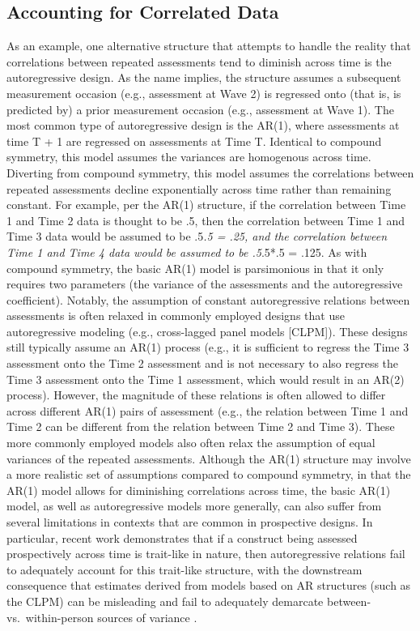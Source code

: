 \documentclass[
  10pt,
  letterpaper,
]{article}
\begin{document}
\hypertarget{accounting-for-correlated-data}{%
\subsection{Accounting for Correlated
Data}\label{accounting-for-correlated-data}}

As an example, one alternative structure that attempts to handle the
reality that correlations between repeated assessments tend to diminish
across time is the autoregressive design. As the name implies, the
structure assumes a subsequent measurement occasion (e.g., assessment at
Wave 2) is regressed onto (that is, is predicted by) a prior measurement
occasion (e.g., assessment at Wave 1). The most common type of
autoregressive design is the AR(1), where assessments at time T + 1 are
regressed on assessments at Time T. Identical to compound symmetry, this
model assumes the variances are homogenous across time. Diverting from
compound symmetry, this model assumes the correlations between repeated
assessments decline exponentially across time rather than remaining
constant. For example, per the AR(1) structure, if the correlation
between Time 1 and Time 2 data is thought to be .5, then the correlation
between Time 1 and Time 3 data would be assumed to be .5\emph{.5 = .25,
and the correlation between Time 1 and Time 4 data would be assumed to
be .5}.5*.5 = .125. As with compound symmetry, the basic AR(1) model is
parsimonious in that it only requires two parameters (the variance of
the assessments and the autoregressive coefficient). Notably, the
assumption of constant autoregressive relations between assessments is
often relaxed in commonly employed designs that use autoregressive
modeling (e.g., cross-lagged panel models {[}CLPM{]}). These designs
still typically assume an AR(1) process (e.g., it is sufficient to
regress the Time 3 assessment onto the Time 2 assessment and is not
necessary to also regress the Time 3 assessment onto the Time 1
assessment, which would result in an AR(2) process). However, the
magnitude of these relations is often allowed to differ across different
AR(1) pairs of assessment (e.g., the relation between Time 1 and Time 2
can be different from the relation between Time 2 and Time 3). These
more commonly employed models also often relax the assumption of equal
variances of the repeated assessments. Although the AR(1) structure may
involve a more realistic set of assumptions compared to compound
symmetry, in that the AR(1) model allows for diminishing correlations
across time, the basic AR(1) model, as well as autoregressive models
more generally, can also suffer from several limitations in contexts
that are common in prospective designs. In particular, recent work
demonstrates that if a construct being assessed prospectively across
time is trait-like in nature, then autoregressive relations fail to
adequately account for this trait-like structure, with the downstream
consequence that estimates derived from models based on AR structures
(such as the CLPM) can be misleading and fail to adequately demarcate
between- vs.~within-person sources of variance \citep{hamaker2015}.
\end{document}
